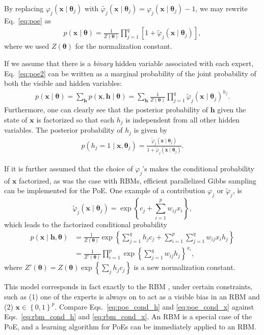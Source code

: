 \documentclass[dissertation,nocontribution,draft*]{aaltoseries}
\newcommand{\vect}[1]{\mathbf{#1}}
\newcommand{\vects}[1]{\boldsymbol{#1}}
\newcommand{\vh}[0]{\vect{h}}
\newcommand{\vx}[0]{\vect{x}}
\newcommand{\TT}[0]{{\vects{\theta}}}
\begin{document}
By replacing $\varphi_j(\vx \mid \TT_j)$ with
$\tilde{\varphi_j}(\vx \mid
\TT_j)=\varphi_j(\vx\mid\TT_j)-1$, we may rewrite
Eq.~\eqref{eq:poe} as
\begin{align}
    \label{eq:poe2}
    p(\vx \mid \TT) = \frac{1}{Z(\TT)}\prod_{j=1}^q \left[ 1 +
    \tilde{\varphi}_j(\vx \mid
    \TT_j)\right],
\end{align}
where we used $Z(\TT)$ for the normalization constant. 

If we assume that there is a \textit{binary} hidden variable
associated with each expert, Eq.~\eqref{eq:poe2} can be
written as a marginal probability of the joint
probability of both the visible and hidden variables:
\begin{align}
    \label{eq:poe2_joint}
    p(\vx \mid \TT) = \sum_{\vh} p(\vx, \vh \mid \TT) =
    \sum_{\vh} \frac{1}{Z(\TT)} \prod_{j=1}^q
    \tilde{\varphi}_j (\vx \mid \TT_j)^{h_j}.
\end{align}
Furthermore, one can clearly see that the posterior
probability of $\vh$ given the state of $\vx$ is factorized
so that each $h_j$ is independent from all other hidden
variables. The posterior probability of $h_j$ is given by
\begin{align}
    \label{eq:poe_cond_h}
    p(h_j = 1 \mid \vx, \TT_j) = \frac{\tilde{\varphi}_j(\vx
    \mid \TT_j)}{1 + \tilde{\varphi}_j(\vx \mid \TT_j)}.
\end{align}

If it is further assumed that the choice of $\varphi_j$'s
makes the conditional probability of $\vx$ 
factorized, as was the case with RBMs, efficient 
parallelized Gibbs sampling can be implemented for the PoE.
One example of a contribution $\varphi_j$ or
$\tilde{\varphi}_j$, is 
\[
\tilde{\varphi}_j(\vx \mid \TT_j) = \exp\left\{ c_j +
\sum_{i=1}^p w_{ij} x_i \right\},
\]
which leads to the factorized conditional probability
\begin{align}
    \label{eq:poe_cond_x}
p(\vx \mid \vh, \TT) &= \frac{1}{Z(\TT)} \exp\left\{
\sum_{j=1}^q h_j c_j + \sum_{i=1}^p \sum_{j=1}^q w_{ij} x_i
h_j \right\} 
\nonumber \\
&= \frac{1}{Z'(\TT)} \prod_{i=1}^p \exp\left\{
\sum_{j=1}^q w_{ij} h_j
\right\}^{x_i},
\end{align}
where $Z'(\TT) = Z(\TT) \exp\left\{ \sum_j h_j c_j \right\}$
is a new normalization constant.

This model corresponds in fact exactly to the RBM
\citep{Freund1994}, under
certain constraints, such as (1) one of the experts is
always on to act as a visible bias in an RBM and (2) $\vx
\in \left\{ 0, 1 \right\}^p$. Compare
Eqs.~\eqref{eq:poe_cond_h} and \eqref{eq:poe_cond_x} against
Eqs.~\eqref{eq:rbm_cond_h} and \eqref{eq:rbm_cond_x}. An RBM
is a special case of the PoE, and a learning algorithm for
PoEs can be immediately applied to an RBM.
\end{document}
